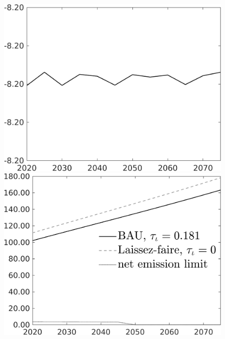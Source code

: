 \begin{figure}[h!!]
\begin{minipage}[]{0.32\textwidth}
	\end{minipage}	
	\begin{minipage}[]{0.32\textwidth}
		\includegraphics[width=1\textwidth]{../../codding_model/own_basedOnFried/optimalPol_010922_revision/figures/all_13Sept22/CompTaul_Equlab_LFBAUPer_Reg0_C_spillover0_nsk1_xgr1_knspil1_sep1_countec0_GovRev0_etaa0.79.png}
	\end{minipage}	
	\begin{minipage}[]{0.32\textwidth}
		\includegraphics[width=1\textwidth]{../../codding_model/own_basedOnFried/optimalPol_010922_revision/figures/all_13Sept22/CompTaul_Equlab_LFBAU_Reg0_Emnet_spillover0_nsk1_xgr1_knspil1_sep1_countec0_GovRev0_etaa0.79_lgd1.png}

\end{minipage}
\end{figure}
